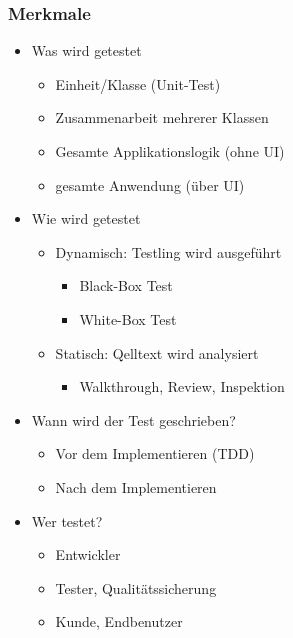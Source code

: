 \documentclass[../ZF_SWEN1.tex]{subfiles}
\begin{document}
\subsubsection{Merkmale}
\begin{itemize}
	\item Was wird getestet
	\begin{itemize}
		\item Einheit/Klasse (Unit-Test)
		\item Zusammenarbeit mehrerer Klassen
		\item Gesamte Applikationslogik (ohne UI)
		\item gesamte Anwendung (über UI)
	\end{itemize}
	\item Wie wird getestet
	\begin{itemize}
		\item Dynamisch: Testling wird ausgeführt
		\begin{itemize}
			\item Black-Box Test
			\item White-Box Test
		\end{itemize}
		\item Statisch: Qelltext wird analysiert
		\begin{itemize}
			\item Walkthrough, Review, Inspektion
		\end{itemize}
	\end{itemize}
	\item Wann wird der Test geschrieben?
	\begin{itemize}
		\item Vor dem Implementieren (TDD)
		\item Nach dem Implementieren
	\end{itemize}
	\item Wer testet?
	\begin{itemize}
		\item Entwickler
		\item Tester, Qualitätssicherung
		\item Kunde, Endbenutzer
	\end{itemize}
\end{itemize}
\end{document}
